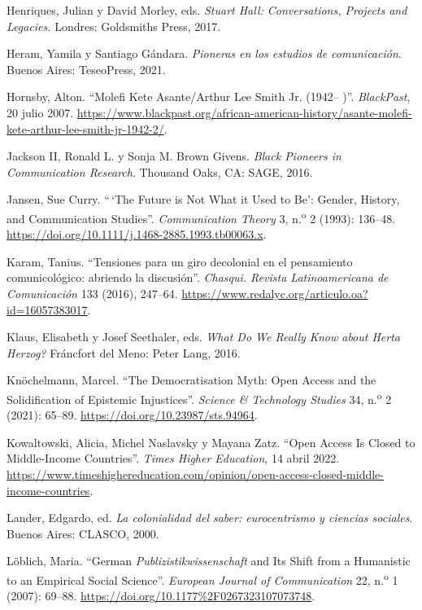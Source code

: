 \documentclass{tufte-handout}
\begin{document}
\begin{hangparas}{.25in}{1}
Henriques, Julian y David Morley, eds. \emph{Stuart Hall: Conversations,
Projects and Legacies.} Londres: Goldsmiths Press, 2017.

Heram, Yamila y Santiago Gándara. \emph{Pioneras en los estudios de
comunicación}. Buenos Aires: TeseoPress, 2021.

Hornsby, Alton. ``Molefi Kete Asante/Arthur Lee Smith Jr. (1942-- )''.
\emph{BlackPast}, 20 julio 2007.
\href{https://www.blackpast.org/african-american-history/asante-molefi-kete-arthur-lee-smith-jr-1942-2/}{https://www.blackpast.org/african-american-history/asante-molefi-kete-arthur-lee-smith-jr-1942-2/}.

Jackson II, Ronald L. y Sonja M. Brown Givens. \emph{Black Pioneers in
Communication Research}. Thousand Oaks, CA: SAGE, 2016.

Jansen, Sue Curry. ``\,`The Future is Not What it Used to Be': Gender,
History, and Communication Studies''. \emph{Communication Theory} 3,
n.\textsuperscript{o} 2 (1993): 136--48.
\url{https://doi.org/10.1111/j.1468-2885.1993.tb00063.x}.

Karam, Tanius. ``Tensiones para un giro decolonial en el pensamiento
comunicológico: abriendo la discusión''. \emph{Chasqui. Revista
Latinoamericana de Comunicación} 133 (2016), 247--64.
\url{https://www.redalyc.org/articulo.oa?id=16057383017}.

Klaus, Elisabeth y Josef Seethaler, eds. \emph{What Do We Really Know
about Herta Herzog?} Fráncfort del Meno: Peter Lang, 2016.

Knöchelmann, Marcel. ``The Democratisation Myth: Open Access and the
Solidification of Epistemic Injustices''. \emph{Science \& Technology
Studies} 34, n.\textsuperscript{o} 2 (2021): 65--89.
\url{https://doi.org/10.23987/sts.94964}.

Kowaltowski, Alicia, Michel Naslavsky y Mayana Zatz. ``Open Access Is
Closed to Middle-Income Countries''. \emph{Times Higher Education}, 14
abril 2022.
\url{https://www.timeshighereducation.com/opinion/open-access-closed-middle-income-countries}.

Lander, Edgardo, ed. \emph{La colonialidad del saber: eurocentrismo y
ciencias sociales}. Buenos Aires: CLASCO, 2000.

Löblich, Maria. ``German \emph{Publizistikwissenschaft} and Its Shift
from a Humanistic to an Empirical Social Science''. \emph{European
Journal of Communication} 22, n.\textsuperscript{o} 1 (2007): 69--88.
\url{https://doi.org/10.1177\%2F0267323107073748}.


\end{hangparas}
\end{document}

